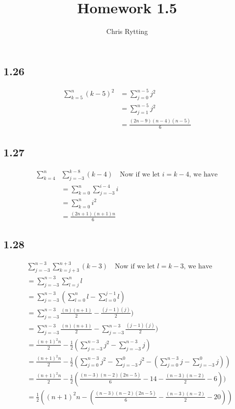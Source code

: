 \documentclass[letterpaper,12pt]{article}
\theoremstyle{definition}
\begin{document}
\title{Homework 1.5}
\author{Chris Rytting}
\maketitle

\subsection*{1.26}

\begin{align*}
\sum^{n}_{k=5} (k-5)^2 &= \sum^{n-5}_{j = 0} j^2
\\&= \sum^{n-5}_{j = 1} j^2
\\&= \frac{(2n-9)(n-4)(n-5)}{6}
\end{align*}

\subsection*{1.27}

\begin{align*}
    \sum^{n}_{k = 4}& \sum^{k-8}_{j = -3} (k-4) \quad \text{Now if we let $i = k-4$, we have}
\\&=\sum^{n}_{k=0} \sum^{i-4}_{j = -3} i
\\&=\sum^{n}_{k=0} i^2
\\&= \frac{(2n+1)(n+1)n}{6}
\end{align*}


\subsection*{1.28}

\begin{align*}
    &\sum^{n-3}_{j = -3} \sum^{n+3}_{k = j+3} (k-3) \quad \text{Now if we let $l = k-3$, we have}
    \\&=\sum^{n-3}_{j = -3} \sum^{n}_{l = j} l
   \\&= \sum^{n-3}_{j = -3} (\sum^{n}_{l = 0} l - \sum^{j-1}_{l = 0} l)
    \\&=\sum^{n-3}_{j = -3} \frac{(n)(n+1)}{2}- \frac{(j-1)(j)}{2})
    \\&=\sum^{n-3}_{j = -3} \frac{(n)(n+1)}{2}- \sum^{n-3}_{j = -3}  \frac{(j-1)(j)}{2})
    \\&=\frac{(n+1)^2n}{2}- \frac{1}{2}(\sum^{n-3}_{j = -3}j^2 - \sum^{n-3}_{j = -3}j )
    \\&=\frac{(n+1)^2n}{2}- \frac{1}{2}(\sum^{n-3}_{j = 0}j^2- \sum^{0}_{j = -3}j^2 - (\sum^{n-3}_{j = 0}j - \sum^{0}_{j = -3}j))
    \\&=\frac{(n+1)^2n}{2}- \frac{1}{2}( \frac{(n-3)(n-2)(2n-5)}{6} - 14 - \frac{(n-3)(n-2)}{2} - 6))
    \\&=\frac{1}{2}((n+1)^2n- ( \frac{(n-3)(n-2)(2n-5)}{6} - \frac{(n-3)(n-2)}{2} - 20))
\end{align*}
\end{document}
